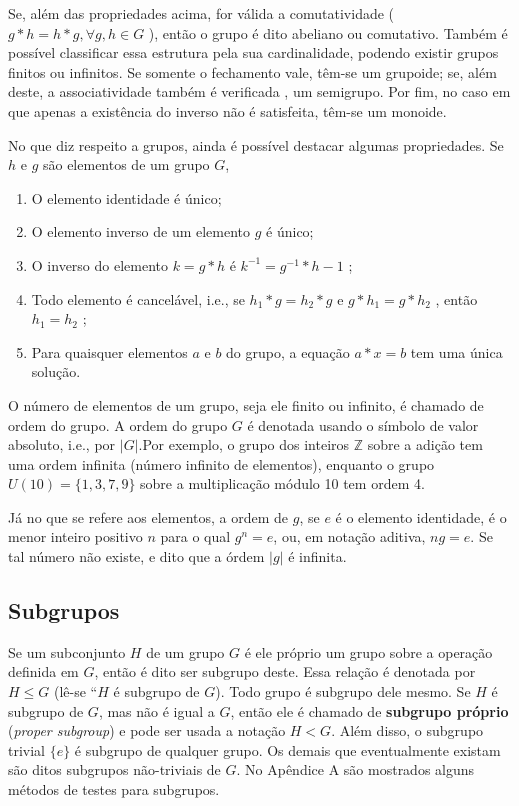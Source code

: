 \documentclass[]{article}
\begin{document}
\par
Se, além das propriedades acima, for válida a comutatividade ( $ g*h = h*g , \forall g , h \in G$ ), então o grupo é dito abeliano ou comutativo. Também é possível classificar essa estrutura pela sua cardinalidade, podendo existir grupos finitos ou infinitos.
Se somente o fechamento vale, têm-se um grupoide; se, além deste, a associatividade também é verificada , um semigrupo. Por fim, no caso em que apenas a existência do inverso não é satisfeita, têm-se um monoide.

\par
No que diz respeito a grupos, ainda é possível destacar algumas propriedades. Se $h$ e $g$ são elementos de um grupo $G$, 

\begin{enumerate}[PG1.]
	\item O elemento identidade é único;
	\item O elemento inverso de um elemento $g$ é único;
	\item  O inverso do elemento $k = g*h$ é $k^{-1}=g^{-1}*h-1$ ;
	\item Todo elemento é cancelável, i.e., se $h _ 1 * g = h _ 2 * g$ e $g*h _ 1 = g*h _ 2$ , então $h _ 1 = h _ 2$ ;
	\item Para quaisquer elementos $a$ e $b$ do grupo, a equação $a*x =b$ tem uma única
	solução.
\end{enumerate}

\par
O número de elementos de um grupo, seja ele finito ou infinito, é chamado de ordem do grupo. A ordem do grupo $G$ é denotada usando o símbolo de valor absoluto, i.e., por $\left| G \right|$.Por exemplo, o grupo dos inteiros $\mathbb{Z}$ sobre a adição tem uma ordem infinita (número infinito de elementos), enquanto o grupo $U(10) = \lbrace 1,3,7,9 \rbrace$ sobre a multiplicação módulo 10 tem  ordem 4.

Já no que se refere aos elementos, a ordem de $g$, se $e$ é o elemento identidade, é o menor inteiro positivo $n$ para o qual $g^n = e$, ou, em notação aditiva, $ng = e$. Se tal número não existe, e dito que a órdem $\left|g\right|$ é infinita. 

\subsection{Subgrupos}

\par
Se um subconjunto $H$ de um grupo $G$ é ele próprio um grupo sobre a operação definida em $G$, então é dito ser subgrupo deste. Essa relação é denotada por $H \leq G $ (lê-se “$H$ é subgrupo de $G$). Todo grupo é subgrupo dele mesmo. Se $H$ é subgrupo de $G$, mas não é igual a $G$, então ele é chamado de \textbf{subgrupo próprio} (\textit{proper subgroup}) e pode ser usada a notação $H < G$. Além disso, o subgrupo trivial $\lbrace e \rbrace$ é subgrupo de qualquer grupo. Os demais que eventualmente existam são ditos subgrupos não-triviais de $G$. No Apêndice A são mostrados alguns métodos de testes para subgrupos.
\end{document}
